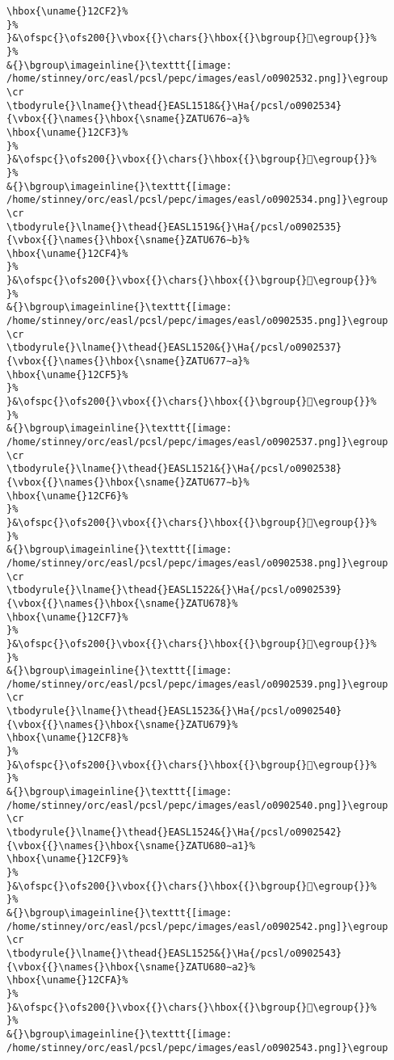 \begin{verbatim}
\hbox{\uname{}12CF2}%
}%
}&\ofspc{}\ofs200{}\vbox{{}\chars{}\hbox{{}\bgroup{}𒳲\egroup{}}%
}%
&{}\bgroup\imageinline{}\texttt{[image: /home/stinney/orc/easl/pcsl/pepc/images/easl/o0902532.png]}\egroup
\cr
\tbodyrule{}\lname{}\thead{}EASL1518&{}\Ha{/pcsl/o0902534}{\vbox{{}\names{}\hbox{\sname{}ZATU676∼a}%
\hbox{\uname{}12CF3}%
}%
}&\ofspc{}\ofs200{}\vbox{{}\chars{}\hbox{{}\bgroup{}𒳳\egroup{}}%
}%
&{}\bgroup\imageinline{}\texttt{[image: /home/stinney/orc/easl/pcsl/pepc/images/easl/o0902534.png]}\egroup
\cr
\tbodyrule{}\lname{}\thead{}EASL1519&{}\Ha{/pcsl/o0902535}{\vbox{{}\names{}\hbox{\sname{}ZATU676∼b}%
\hbox{\uname{}12CF4}%
}%
}&\ofspc{}\ofs200{}\vbox{{}\chars{}\hbox{{}\bgroup{}𒳴\egroup{}}%
}%
&{}\bgroup\imageinline{}\texttt{[image: /home/stinney/orc/easl/pcsl/pepc/images/easl/o0902535.png]}\egroup
\cr
\tbodyrule{}\lname{}\thead{}EASL1520&{}\Ha{/pcsl/o0902537}{\vbox{{}\names{}\hbox{\sname{}ZATU677∼a}%
\hbox{\uname{}12CF5}%
}%
}&\ofspc{}\ofs200{}\vbox{{}\chars{}\hbox{{}\bgroup{}𒳵\egroup{}}%
}%
&{}\bgroup\imageinline{}\texttt{[image: /home/stinney/orc/easl/pcsl/pepc/images/easl/o0902537.png]}\egroup
\cr
\tbodyrule{}\lname{}\thead{}EASL1521&{}\Ha{/pcsl/o0902538}{\vbox{{}\names{}\hbox{\sname{}ZATU677∼b}%
\hbox{\uname{}12CF6}%
}%
}&\ofspc{}\ofs200{}\vbox{{}\chars{}\hbox{{}\bgroup{}𒳶\egroup{}}%
}%
&{}\bgroup\imageinline{}\texttt{[image: /home/stinney/orc/easl/pcsl/pepc/images/easl/o0902538.png]}\egroup
\cr
\tbodyrule{}\lname{}\thead{}EASL1522&{}\Ha{/pcsl/o0902539}{\vbox{{}\names{}\hbox{\sname{}ZATU678}%
\hbox{\uname{}12CF7}%
}%
}&\ofspc{}\ofs200{}\vbox{{}\chars{}\hbox{{}\bgroup{}𒳷\egroup{}}%
}%
&{}\bgroup\imageinline{}\texttt{[image: /home/stinney/orc/easl/pcsl/pepc/images/easl/o0902539.png]}\egroup
\cr
\tbodyrule{}\lname{}\thead{}EASL1523&{}\Ha{/pcsl/o0902540}{\vbox{{}\names{}\hbox{\sname{}ZATU679}%
\hbox{\uname{}12CF8}%
}%
}&\ofspc{}\ofs200{}\vbox{{}\chars{}\hbox{{}\bgroup{}𒳸\egroup{}}%
}%
&{}\bgroup\imageinline{}\texttt{[image: /home/stinney/orc/easl/pcsl/pepc/images/easl/o0902540.png]}\egroup
\cr
\tbodyrule{}\lname{}\thead{}EASL1524&{}\Ha{/pcsl/o0902542}{\vbox{{}\names{}\hbox{\sname{}ZATU680∼a1}%
\hbox{\uname{}12CF9}%
}%
}&\ofspc{}\ofs200{}\vbox{{}\chars{}\hbox{{}\bgroup{}𒳹\egroup{}}%
}%
&{}\bgroup\imageinline{}\texttt{[image: /home/stinney/orc/easl/pcsl/pepc/images/easl/o0902542.png]}\egroup
\cr
\tbodyrule{}\lname{}\thead{}EASL1525&{}\Ha{/pcsl/o0902543}{\vbox{{}\names{}\hbox{\sname{}ZATU680∼a2}%
\hbox{\uname{}12CFA}%
}%
}&\ofspc{}\ofs200{}\vbox{{}\chars{}\hbox{{}\bgroup{}𒳺\egroup{}}%
}%
&{}\bgroup\imageinline{}\texttt{[image: /home/stinney/orc/easl/pcsl/pepc/images/easl/o0902543.png]}\egroup

\end{verbatim}
